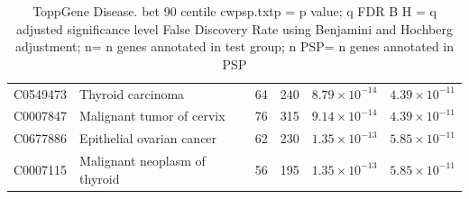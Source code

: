 \begin{table}[ht]
\begin{adjustbox}{width=\textwidth}
\begin{tabular}{llrrrr}
  C0549473 & Thyroid carcinoma & 64 & 240 & $8.79 \times 10^{-14}$ & $4.39 \times 10^{-11}$ \\ 
  C0007847 & Malignant tumor of cervix & 76 & 315 & $9.14 \times 10^{-14}$ & $4.39 \times 10^{-11}$ \\ 
  C0677886 & Epithelial ovarian cancer & 62 & 230 & $1.35 \times 10^{-13}$ & $5.85 \times 10^{-11}$ \\ 
  C0007115 & Malignant neoplasm of thyroid & 56 & 195 & $1.35 \times 10^{-13}$ & $5.85 \times 10^{-11}$ \\ 
   \hline
\end{tabular}
\end{adjustbox}
\caption{ToppGene Disease. bet 90 centile cwpsp.txtp = p value; q FDR B H = q adjusted significance level False Discovery Rate using Benjamini and Hochberg adjustment; n= n genes annotated in test group; n PSP= n genes annotated in PSP} 
\label{tab:ToppGENE Disease. bet 90 centile cwpsp.txtp = p value; q FDR B H = q adjusted significance level False Discovery Rate using Benjamini and Hochberg adjustment; n= n genes annotated in test group; n PSP= n genes annotated in PSP}
\end{table}


